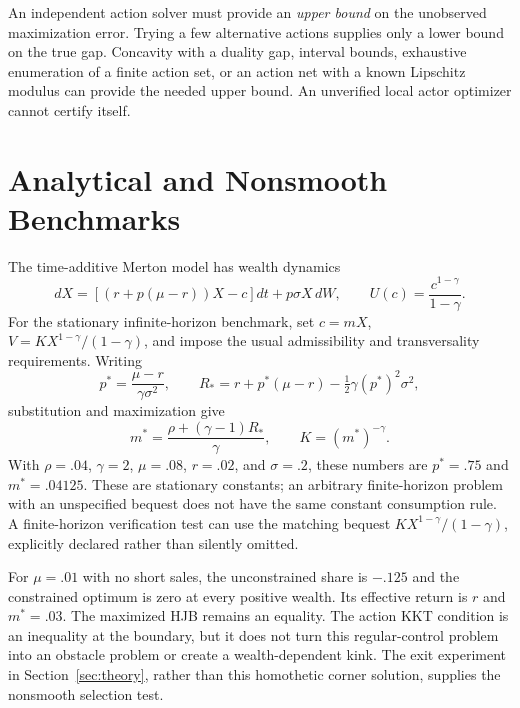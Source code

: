 \documentclass[ecta,draft]{econsocart}
\theoremstyle{definition}
\theoremstyle{remark}
\begin{document}
An independent action solver must provide an \emph{upper bound} on the unobserved maximization error. Trying a few alternative actions supplies only a lower bound on the true gap. Concavity with a duality gap, interval bounds, exhaustive enumeration of a finite action set, or an action net with a known Lipschitz modulus can provide the needed upper bound. An unverified local actor optimizer cannot certify itself.





\section{Analytical and Nonsmooth Benchmarks}\label{sec:benchmarks}
The time-additive Merton model has wealth dynamics
\[
 dX=[(r+p(\mu-r))X-c]dt+p\sigma X\,dW,
 \qquad U(c)=\frac{c^{1-\gamma}}{1-\gamma}.
\]
For the stationary infinite-horizon benchmark, set $c=mX$, $V=KX^{1-\gamma}/(1-\gamma)$, and impose the usual admissibility and transversality requirements. Writing
\[
 p^*=\frac{\mu-r}{\gamma\sigma^2},\qquad
 R_*=r+p^*(\mu-r)-\tfrac12\gamma(p^*)^2\sigma^2,
\]
substitution and maximization give
\begin{equation}\label{eq:merton}
 m^*=\frac{\rho+(\gamma-1)R_*}{\gamma},\qquad K=(m^*)^{-\gamma}.
\end{equation}
With $\rho=.04$, $\gamma=2$, $\mu=.08$, $r=.02$, and $\sigma=.2$, these numbers are $p^*=.75$ and $m^*=.04125$. These are stationary constants; an arbitrary finite-horizon problem with an unspecified bequest does not have the same constant consumption rule. A finite-horizon verification test can use the matching bequest $KX^{1-\gamma}/(1-\gamma)$, explicitly declared rather than silently omitted.

For $\mu=.01$ with no short sales, the unconstrained share is $-.125$ and the constrained optimum is zero at every positive wealth. Its effective return is $r$ and $m^*=.03$. The maximized HJB remains an equality. The action KKT condition is an inequality at the boundary, but it does not turn this regular-control problem into an obstacle problem or create a wealth-dependent kink. The exit experiment in Section~\ref{sec:theory}, rather than this homothetic corner solution, supplies the nonsmooth selection test.
\end{document}
